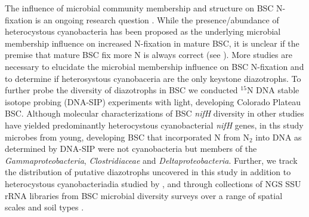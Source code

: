 The influence of microbial community membership and structure on BSC N-fixation
is an ongoing research question \citep{Belnap28062013}. While the
presence/abundance of heterocystous cyanobacteria has been proposed as the
underlying microbial membership influence on increased N-fixation in mature
BSC, it is unclear if the premise that mature BSC fix more N is always correct
(see \citet{15643930}). More studies are necessary to elucidate the microbial
membership influence on BSC N-fixation and to determine if heterosystous
cyanobaceria are the only keystone diazotrophs. To further probe the diversity
of diazotrophs in BSC we conducted $^{15}$N DNA stable isotope probing
(DNA-SIP) experiments with light, developing Colorado Plateau BSC. Although
molecular characterizations of BSC \textit{nifH} diversity in other studies
have yielded predominantly heterocystous cyanobacterial \textit{nifH} genes, in
ths study microbes from young, developing BSC that incorporated N from
N$_{2}$ into DNA as determined by DNA-SIP were not cyanobacteria but
members of the \textit{Gammaproteobacteria}, \textit{Clostridiaceae} and
\textit{Deltaproteobacteria}. Further, we track the distribution of putative
diazotrophs uncovered in this study in addition to heterocystous
cyanobacteriadia studied by \citet{14766579}, \citet{Yeager} and
\citet{Yeager_2012} through collections of NGS SSU rRNA libraries from BSC
microbial diversity surveys over a range of spatial scales and soil types
\citep{Garcia_Pichel_2013, Steven_2013}.
